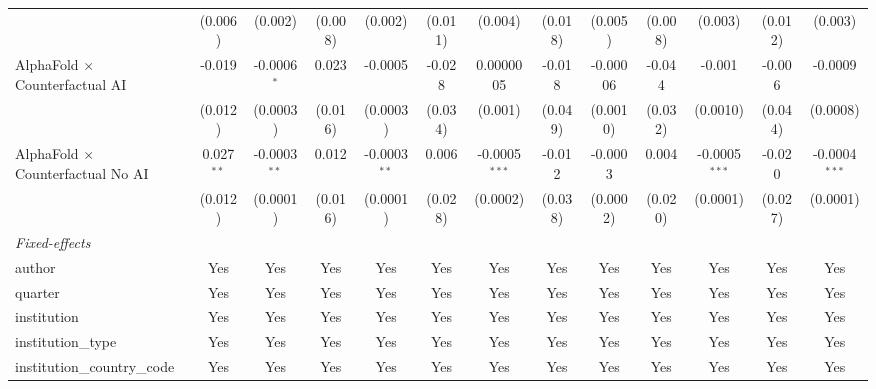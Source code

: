 \begin{tabular}{lcccccccccccc}
                                            & (0.006)       & (0.002)        & (0.008)       & (0.002)        & (0.011)     & (0.004)         & (0.018)       & (0.005)  & (0.008)       & (0.003)         & (0.012)       & (0.003)\\   
   AlphaFold $\times$ Counterfactual AI     & -0.019        & -0.0006$^{*}$  & 0.023         & -0.0005        & -0.028      & 0.0000005       & -0.018        & -0.00006 & -0.044        & -0.001          & -0.006        & -0.0009\\   
                                            & (0.012)       & (0.0003)       & (0.016)       & (0.0003)       & (0.034)     & (0.001)         & (0.049)       & (0.0010) & (0.032)       & (0.0010)        & (0.044)       & (0.0008)\\   
   AlphaFold $\times$ Counterfactual No AI  & 0.027$^{**}$  & -0.0003$^{**}$ & 0.012         & -0.0003$^{**}$ & 0.006       & -0.0005$^{***}$ & -0.012        & -0.0003  & 0.004         & -0.0005$^{***}$ & -0.020        & -0.0004$^{***}$\\   
                                            & (0.012)       & (0.0001)       & (0.016)       & (0.0001)       & (0.028)     & (0.0002)        & (0.038)       & (0.0002) & (0.020)       & (0.0001)        & (0.027)       & (0.0001)\\   
   \midrule
   \emph{Fixed-effects}\\
   author                                   & Yes           & Yes            & Yes           & Yes            & Yes         & Yes             & Yes           & Yes      & Yes           & Yes             & Yes           & Yes\\  
   quarter                                  & Yes           & Yes            & Yes           & Yes            & Yes         & Yes             & Yes           & Yes      & Yes           & Yes             & Yes           & Yes\\  
   institution                              & Yes           & Yes            & Yes           & Yes            & Yes         & Yes             & Yes           & Yes      & Yes           & Yes             & Yes           & Yes\\  
   institution\_type                        & Yes           & Yes            & Yes           & Yes            & Yes         & Yes             & Yes           & Yes      & Yes           & Yes             & Yes           & Yes\\  
   institution\_country\_code               & Yes           & Yes            & Yes           & Yes            & Yes         & Yes             & Yes           & Yes      & Yes           & Yes             & Yes           & Yes\\  

\end{tabular}
